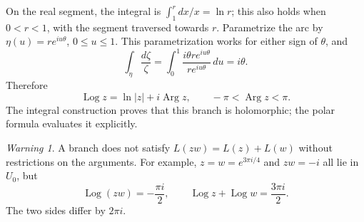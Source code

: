 \documentclass[11pt]{article}
\theoremstyle{plain}
\theoremstyle{definition}
\theoremstyle{remark}
\newtheorem*{warning}{Warning}
\numberwithin{equation}{section}
\DeclareMathOperator{\Log}{Log}
\DeclareMathOperator{\Arg}{Arg}
\begin{document}
\begin{center}
\end{center}
On the real segment, the integral is $\int_1^r dx/x=\ln r$;
this also holds when $0<r<1$, with the segment traversed towards $r$.
Parametrize the arc by $\eta(u)=re^{iu\theta}$, $0\leq u\leq1$.
This parametrization works for either sign of $\theta$, and
\[
 \int_\eta\frac{d\zeta}{\zeta}
 =\int_0^1\frac{i\theta re^{iu\theta}}{re^{iu\theta}}\,du=i\theta.
\]
Therefore
\[
 \boxed{\Log z=\ln|z|+i\Arg z,\qquad -\pi<\Arg z<\pi.}
\]
The integral construction proves that this branch is holomorphic;
the polar formula evaluates it explicitly.

\begin{warning}
A branch does not satisfy $L(zw)=L(z)+L(w)$ without restrictions on the
arguments. For example, $z=w=e^{3\pi i/4}$ and $zw=-i$ all lie in $U_0$,
but
\[
 \Log(zw)=-\frac{\pi i}{2},\qquad \Log z+\Log w=\frac{3\pi i}{2}.
\]
The two sides differ by $2\pi i$.
\end{warning}
\end{document}
